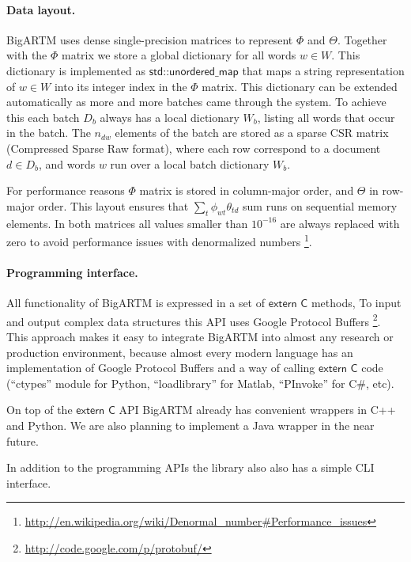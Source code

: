 \documentclass[russian]{llncs}
\newcommand{\kw}[1]{\textsf{#1}}
\begin{document}
\paragraph{Data layout.}
BigARTM uses dense single-precision matrices to represent $\Phi$ and $\Theta$.
Together with the $\Phi$ matrix we store a global dictionary for all words $w \in W$.
This dictionary is implemented as $\kw{std::unordered\_map}$ that maps a string representation of $w \in W$
into its integer index in the $\Phi$ matrix.
This dictionary can be extended automatically as more and more batches came through the system.
To achieve this each batch $D_b$ always has a local dictionary $W_b$, listing all words that occur in the batch.
The $n_{dw}$ elements of the batch are stored as a sparse CSR matrix (Compressed Sparse Raw format),
where each row correspond to a document $d \in D_b$, and words $w$ run over a local batch dictionary $W_b$.

For performance reasons $\Phi$ matrix is stored in column-major order, and $\Theta$ in row-major order.
This layout ensures that $\sum_t \phi_{wt} \theta_{td}$ sum runs on sequential memory elements.
In both matrices all values smaller than $10^{-16}$ are always replaced with zero to avoid performance issues with denormalized numbers
\footnote{\url{http://en.wikipedia.org/wiki/Denormal_number#Performance_issues}}.

\paragraph{Programming interface.}
All functionality of BigARTM is expressed in a set of $\kw{extern C}$ methods,
To input and output complex data structures this API uses Google Protocol Buffers
\footnote{\url{http://code.google.com/p/protobuf/}}.
This approach makes it easy to integrate BigARTM into almost any research or production environment,
because almost every modern language has an implementation of Google Protocol Buffers
and a way of calling $\kw{extern C}$ code
(``ctypes'' module for Python, ``loadlibrary'' for Matlab, ``PInvoke'' for C\#, etc).

On top of the $\kw{extern C}$ API BigARTM already has convenient wrappers in C++ and Python.
We are also planning to implement a Java wrapper in the near future.

In addition to the programming APIs the library also also has a simple CLI interface.
\end{document}
